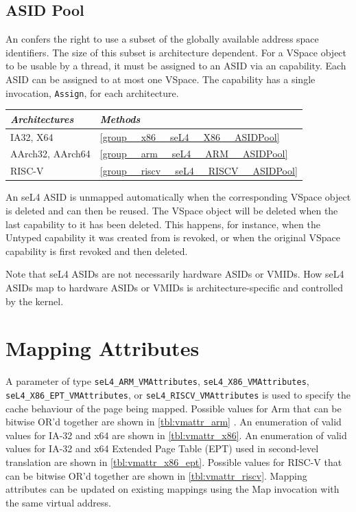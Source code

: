 \subsection{ASID Pool}

An  confers the right to use a subset of the globally available address space
identifiers. The size of this subset is architecture dependent. For a VSpace object to be usable by
a thread, it must be assigned to an ASID via an  capability. Each ASID can be
assigned to at most one VSpace. The  capability has a single invocation,
\texttt{Assign}, for each architecture.

\begin{tabularx}{\textwidth}{Xl} \toprule
\emph{Architectures} & \emph{Methods} \\ \midrule
IA32, X64            & \autoref{group__x86__seL4__X86__ASIDPool} \\
AArch32, AArch64     & \autoref{group__arm__seL4__ARM__ASIDPool} \\
RISC-V               & \autoref{group__riscv__seL4__RISCV__ASIDPool} \\
\bottomrule
\end{tabularx}

An seL4 ASID is unmapped automatically when the corresponding VSpace object is deleted and can then
be reused. The VSpace object will be deleted when the last capability to it has been deleted. This
happens, for instance, when the Untyped capability it was created from is revoked, or when the
original VSpace capability is first revoked and then deleted.

Note that seL4 ASIDs are not necessarily hardware ASIDs or VMIDs. How seL4 ASIDs map to hardware
ASIDs or VMIDs is architecture-specific and controlled by the kernel.

\section{Mapping Attributes}
A parameter of type \texttt{seL4\_ARM\_VMAttributes}, \texttt{seL4\_X86\_VMAttributes},
\texttt{seL4\_X86\_EPT\_VMAttributes}, or \texttt{seL4\_RISCV\_VMAttributes} is used to specify the
cache behaviour of the page being mapped. Possible values for Arm that can be bitwise OR'd together
are shown in \autoref{tbl:vmattr_arm} \ifxeightsix. An enumeration of valid values for IA-32 and x64
are shown in \autoref{tbl:vmattr_x86}. An enumeration of valid values for IA-32 and x64 Extended
Page Table (EPT) used in second-level translation are shown in \autoref{tbl:vmattr_x86_ept}.
Possible values for RISC-V that can be bitwise OR'd together are shown in
\autoref{tbl:vmattr_riscv}. Mapping attributes can be updated on existing mappings using the Map
invocation with the same virtual address.

